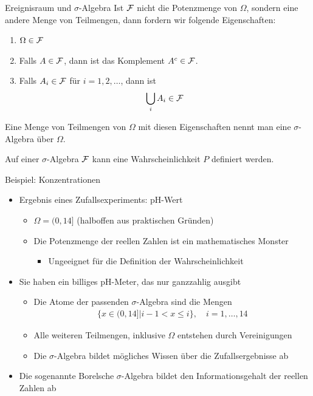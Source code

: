 \begin{frame}{Ereignisraum und $\sigma$-Algebra}
  Ist $\mathcal F$ nicht die Potenzmenge von $\Omega$, sondern eine
  andere Menge von Teilmengen, dann fordern wir folgende
  Eigenschaften:
  \begin{enumerate}
  \item $\Omega\in\mathcal F$
  \item Falls $A\in\mathcal F$, dann ist das Komplement $A^c\in\mathcal F$.
  \item Falls $A_i\in\mathcal F$ für $i=1,2,\dots$, dann ist
    \begin{gather*}
      \bigcup_{i} A_i\in\mathcal F
    \end{gather*}
  \end{enumerate}
  Eine Menge von Teilmengen von $\Omega$ mit diesen Eigenschaften
  nennt man eine $\sigma$-Algebra über $\Omega$.

  \pause

  Auf einer $\sigma$-Algebra $\mathcal F$ kann eine
  Wahrscheinlichkeit $P$ definiert werden.
\end{frame}

\begin{frame}{Beispiel: Konzentrationen}
  \begin{itemize}
  \item Ergebnis eines Zufallsexperiments: pH-Wert
    \begin{itemize}
    \item $\Omega = (0,14]$ (halboffen aus praktischen Gründen)
    \item Die Potenzmenge der reellen Zahlen ist ein mathematisches Monster
      \begin{itemize}
      \item Ungeeignet für die Definition der Wahrscheinlichkeit
      \end{itemize}
    \end{itemize}
    \pause
  \item Sie haben ein billiges pH-Meter, das nur ganzzahlig ausgibt
    \begin{itemize}
    \item Die \glqq{}Atome\grqq{} der passenden $\sigma$-Algebra sind die Mengen
      \begin{gather*}
        \bigl\{ x\in(0,14]\big| i-1<x\le i\bigr\},\quad i=1,\dots,14
      \end{gather*}
    \item Alle weiteren Teilmengen, inklusive $\Omega$ entstehen
      durch Vereinigungen
    \item Die $\sigma$-Algebra bildet mögliches Wissen über die Zufallsergebnisse ab
    \end{itemize}
    \pause
  \item Die sogenannte Borelsche $\sigma$-Algebra bildet den
    Informationsgehalt der reellen Zahlen ab
  \end{itemize}
\end{frame}


